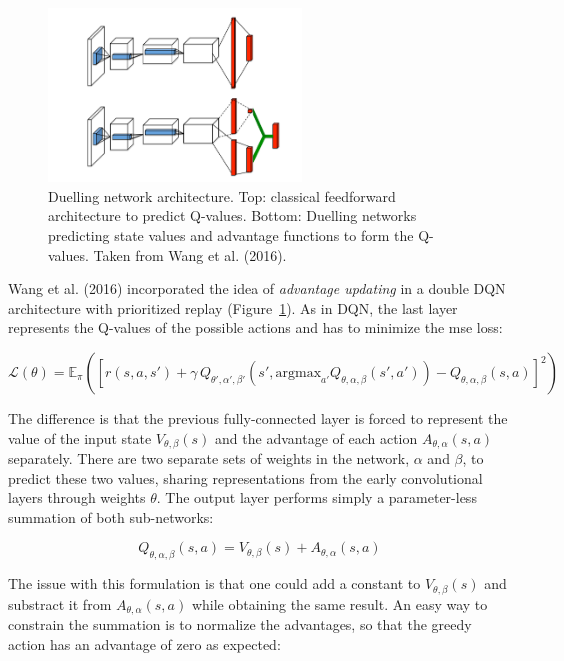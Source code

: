 \documentclass[
  letterpaper,
  DIV=11,
  numbers=noendperiod]{scrreprt}
\begin{document}
\begin{figure}

{\centering \includegraphics[width=0.6\textwidth,height=\textheight]{./img/duelling.png}

}

\caption{\label{fig-duelling}Duelling network architecture. Top:
classical feedforward architecture to predict Q-values. Bottom: Duelling
networks predicting state values and advantage functions to form the
Q-values. Taken from Wang et al. (2016).}

\end{figure}

Wang et al. (2016) incorporated the idea of \emph{advantage updating} in
a double DQN architecture with prioritized replay
(Figure~\ref{fig-duelling}). As in DQN, the last layer represents the
Q-values of the possible actions and has to minimize the mse loss:

\[
    \mathcal{L}(\theta) = \mathbb{E}_\pi([r(s, a, s') + \gamma \, Q_{\theta', \alpha', \beta'}(s', \text{argmax}_{a'} Q_{\theta, \alpha, \beta} (s', a')) - Q_{\theta, \alpha, \beta}(s, a)]^2)
\]

The difference is that the previous fully-connected layer is forced to
represent the value of the input state \(V_{\theta, \beta}(s)\) and the
advantage of each action \(A_{\theta, \alpha}(s, a)\) separately. There
are two separate sets of weights in the network, \(\alpha\) and
\(\beta\), to predict these two values, sharing representations from the
early convolutional layers through weights \(\theta\). The output layer
performs simply a parameter-less summation of both sub-networks:

\[
    Q_{\theta, \alpha, \beta}(s, a) = V_{\theta, \beta}(s) + A_{\theta, \alpha}(s, a)
\]

The issue with this formulation is that one could add a constant to
\(V_{\theta, \beta}(s)\) and substract it from
\(A_{\theta, \alpha}(s, a)\) while obtaining the same result. An easy
way to constrain the summation is to normalize the advantages, so that
the greedy action has an advantage of zero as expected:
\end{document}
